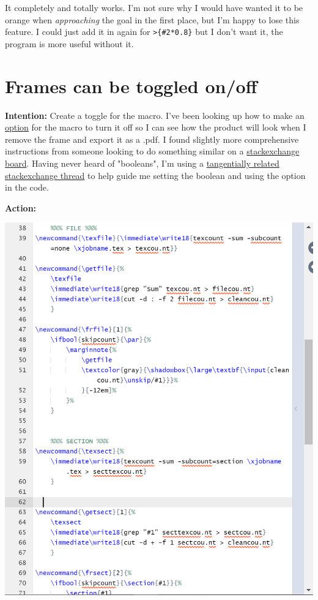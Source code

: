 \documentclass[12pt]{article}
\begin{document}
\flushleft It completely and totally works. I'm not sure why I would have wanted it to be orange when \textit{approaching} the goal in the first place, but I'm happy to lose this feature. I could just add it in again for \texttt{>\{\#2*0.8\}} but I don't want it, the program is more useful without it. 


\section{\large Frames can be toggled on/off} 

\textbf{Intention:} Create a toggle for the macro. I've been looking up how to make an \href{https://www.overleaf.com/learn/latex/Writing_your_own_package#Preliminary_declarations}{option} for the macro to turn it off so I can see how the product will look when I remove the frame and export it as a .pdf. I found slightly more comprehensive instructions from someone looking to do something similar on a \href{https://tex.stackexchange.com/a/449385}{stackexchange board}. Having never heard of "booleans", I'm using a \href{https://tex.stackexchange.com/questions/101076/difference-between-newbool-and-newtoggle-from-etoolbox-package}{tangentially related stackexchange thread} to help guide me setting the boolean and using the option in the code.

\textbf{Action:}

\includegraphics[scale=0.7]{imgelaborationbooleans.PNG}
\end{document}
